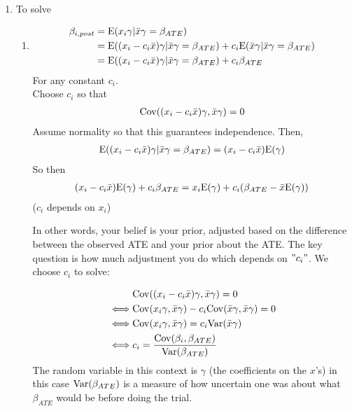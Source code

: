 \begin{enumerate}
	\item To solve
		\begin{enumerate}
			\item
				\begin{align*}
					\beta_{i,post} & = \mathrm{E} (x_i \gamma | \bar x \gamma = \beta_{ATE})                                                                        \\
								   & = \mathrm{E}((x_i - c_i \bar{x}) \gamma | \bar{x} \gamma = \beta_{ATE}) + c_i \mathrm{E}(\bar{x} \gamma | \bar{x} \gamma = \beta_{ATE}) \\
								   & = \mathrm{E}((x_{i} - c_i \bar{x}) \gamma | \bar{x} \gamma = \beta_{ATE}) + c_i \beta_{ATE}                                       \\
				\end{align*}
				For any constant $c_i$. \\
				Choose $c_i$ so that 
				\begin{align*}
					\mathrm{Cov}((x_{i} - c_i \bar{x})\gamma, \bar{x} \gamma) = 0
				\end{align*} 
				Assume normality so that this guarantees independence.
				Then,
				\begin{align*}
					\mathrm{E}((x_i - c_i \bar{x}) \gamma | \bar{x} \gamma = \beta_{ATE}) = (x_{i} - c_i \bar{x}) \mathrm{E}(\gamma)
				\end{align*}
				So then
				\begin{align*}
					(x_i - c_i \bar{x}) \mathrm{E}(\gamma) + c_i \beta_{ATE} = x_i \mathrm{E}(\gamma) + c_i (\beta_{ATE} - \bar{x} \mathrm{E}(\gamma))
				\end{align*} 
				($c_i$ depends on $x_i$)

				In other words, your belief is your prior, adjusted based on the difference between the observed ATE and your prior about the ATE.
				The key question is how much adjustment you do which depends on $"c_i"$. We choose $c_i$ to solve:

				\begin{align*}
                          & \mathrm{Cov} ((x_i - c_i \bar{x}) \gamma, \bar{x} \gamma) = 0                          \\
				 \iff     & \mathrm{Cov}(x_i \gamma, \bar{x} \gamma) -c_i \mathrm{Cov}(\bar{x} \gamma, \bar{x} \gamma) = 0 \\
					\iff  & \mathrm{Cov}(x_i \gamma, \bar{x} \gamma) = c_i \mathrm{Var}(\bar{x} \gamma)                  \\
				\iff & c_i = \frac{\mathrm{Cov}(\beta_i, \beta_{ATE}) }{ \mathrm{Var}(\beta_{ATE})}
				\end{align*} 
				The random variable in this context is $\gamma$ (the coefficients on the $x $'s) in this case $\mathrm{Var}(\beta_{ATE})$ is a measure of how uncertain one was about what $\beta_{ATE}$ would be before doing the trial.


\end{enumerate}
\end{enumerate}

